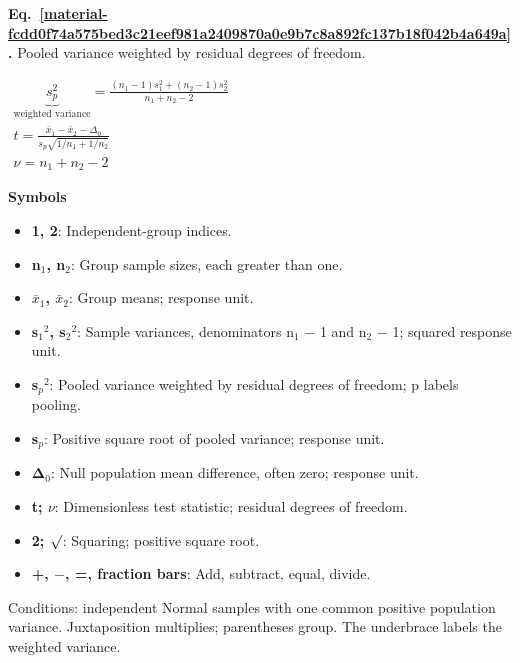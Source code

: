\documentclass[11pt,a4paper]{article}
\begin{document}
\par\medskip
\noindent\begin{minipage}{\linewidth}
\label{material-fcdd0f74a575bed3c21eef981a2409870a0e9b7c8a892fc137b18f042b4a649a}
\noindent\textbf{Eq.~\ref*{material-fcdd0f74a575bed3c21eef981a2409870a0e9b7c8a892fc137b18f042b4a649a}.} Pooled variance weighted by residual degrees of freedom.\par\nopagebreak
\begin{center}\begin{adjustbox}{max width=\linewidth}$\displaystyle \begin{gathered}\underbrace{s_p^2}_{\text{weighted variance}}=\frac{(n_1-1)s_1^2+(n_2-1)s_2^2}{n_1+n_2-2}\\t=\frac{\bar x_1-\bar x_2-\Delta_0}{s_p\sqrt{1/n_1+1/n_2}}\\\nu=n_1+n_2-2\end{gathered}$\end{adjustbox}\end{center}

\par\noindent\textbf{Symbols}

\begin{itemize}\setlength{\itemsep}{1pt}\setlength{\parsep}{0pt}
\item \textbf{1, 2}: Independent-group indices.
\item \textbf{n\ensuremath{{}_1}, n\ensuremath{{}_2}}: Group sample sizes, each greater than one.
\item \textbf{\ensuremath{\bar{x}}\ensuremath{{}_1}, \ensuremath{\bar{x}}\ensuremath{{}_2}}: Group means; response unit.
\item \textbf{s\ensuremath{{}_1}\ensuremath{{}^2}, s\ensuremath{{}_2}\ensuremath{{}^2}}: Sample variances, denominators n\ensuremath{{}_1} \ensuremath{-} 1 and n\ensuremath{{}_2} \ensuremath{-} 1; squared response unit.
\item \textbf{s\ensuremath{{}_p}\ensuremath{{}^2}}: Pooled variance weighted by residual degrees of freedom; p labels pooling.
\item \textbf{s\ensuremath{{}_p}}: Positive square root of pooled variance; response unit.
\item \textbf{Δ\ensuremath{{}_0}}: Null population mean difference, often zero; response unit.
\item \textbf{t; \ensuremath{\nu}}: Dimensionless test statistic; residual degrees of freedom.
\item \textbf{2; \ensuremath{\sqrt{\vphantom{x}}}}: Squaring; positive square root.
\item \textbf{+, \ensuremath{-}, =, fraction bars}: Add, subtract, equal, divide.
\end{itemize}

Conditions: independent Normal samples with one common positive population variance. Juxtaposition multiplies; parentheses group. The underbrace labels the weighted variance.

\end{minipage}\par
\medskip
\end{document}
